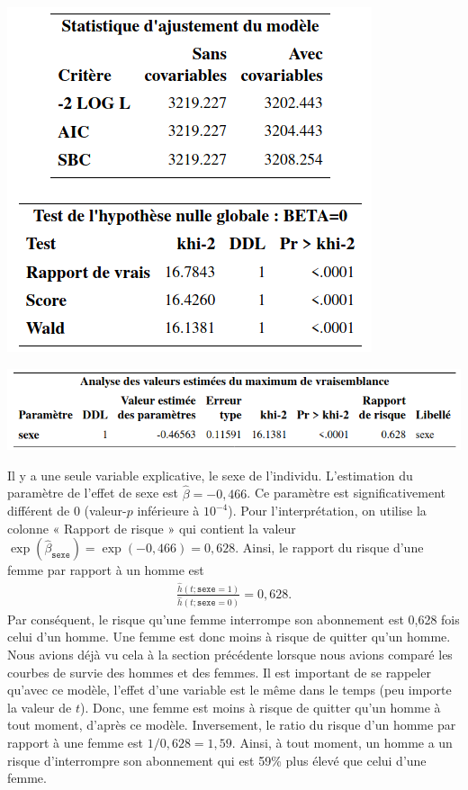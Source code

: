\documentclass[
  11pt,
  letterpaper,
]{book}
\theoremstyle{definition}
\theoremstyle{definition}
\theoremstyle{definition}
\theoremstyle{remark}
\begin{document}
\begin{center}\includegraphics[width=0.45\linewidth]{figures/05-survie-e11} \end{center}

\begin{center}\includegraphics[width=0.85\linewidth]{figures/05-survie-e12} \end{center}

Il y a une seule variable explicative, le sexe de l'individu. L'estimation du paramètre de l'effet de sexe est \(\hat{\beta}=-0,466\). Ce paramètre est significativement différent de \(0\) (valeur-\(p\) inférieure à \(10^{-4}\)). Pour l'interprétation, on utilise la colonne « Rapport de risque » qui contient la valeur \(\exp(\hat{\beta}_{\texttt{sexe}}) = \exp(-0,466) = 0,628\). Ainsi, le rapport du risque d'une femme par rapport à un homme est
\begin{align*}
 \frac{\hat{h}(t; \texttt{sexe}=1)}{\hat{h}(t; \texttt{sexe}=0)}= 0,628.
\end{align*}
Par conséquent, le risque qu'une femme interrompe son abonnement est 0,628 fois celui d'un homme. Une femme est donc moins à risque de quitter qu'un homme. Nous avions déjà vu cela à la section précédente lorsque nous avions comparé les courbes de survie des hommes et des femmes. Il est important de se rappeler qu'avec ce modèle, l'effet d'une variable est le même dans le temps (peu importe la valeur de \(t\)). Donc, une femme est moins à risque de quitter qu'un homme à tout moment, d'après ce modèle. Inversement, le ratio du risque d'un homme par rapport à une femme est \(1/0,628=1,59\). Ainsi, à tout moment, un homme a un risque d'interrompre son abonnement qui est 59\% plus élevé que celui d'une femme.
\end{document}
